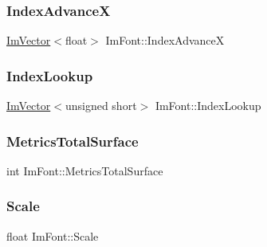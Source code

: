\hypertarget{struct_im_font_af906476eda06d8a842d0a843a247f530}{}\label{struct_im_font_af906476eda06d8a842d0a843a247f530} 
\subsubsection{\texorpdfstring{Index\+AdvanceX}{IndexAdvanceX}}
{\footnotesize\ttfamily \hyperlink{class_im_vector}{Im\+Vector}$<$float$>$ Im\+Font\+::\+Index\+AdvanceX}

\hypertarget{struct_im_font_aaab48cbf05ca962d71ab3e7b597b992f}{}\label{struct_im_font_aaab48cbf05ca962d71ab3e7b597b992f} 
\subsubsection{\texorpdfstring{Index\+Lookup}{IndexLookup}}
{\footnotesize\ttfamily \hyperlink{class_im_vector}{Im\+Vector}$<$unsigned short$>$ Im\+Font\+::\+Index\+Lookup}

\hypertarget{struct_im_font_a8087b2ee8b27dcf5c6e30a8318f87cc7}{}\label{struct_im_font_a8087b2ee8b27dcf5c6e30a8318f87cc7} 
\subsubsection{\texorpdfstring{Metrics\+Total\+Surface}{MetricsTotalSurface}}
{\footnotesize\ttfamily int Im\+Font\+::\+Metrics\+Total\+Surface}

\hypertarget{struct_im_font_ae98fb07fd8862a7243d77b11f38bba19}{}\label{struct_im_font_ae98fb07fd8862a7243d77b11f38bba19} 
\subsubsection{\texorpdfstring{Scale}{Scale}}
{\footnotesize\ttfamily float Im\+Font\+::\+Scale}


